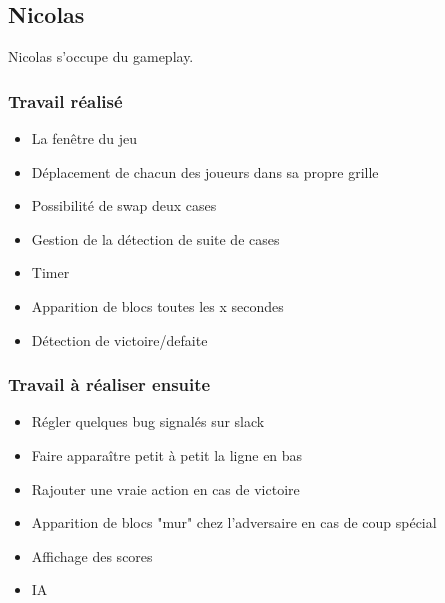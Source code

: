 \documentclass[a4paper,utf8]{article}
\begin{document}
	\subsection{Nicolas}
		Nicolas s'occupe du gameplay.
		\subsubsection{Travail r\'ealis\'e}
			\begin{itemize}
				\item La fen\^{e}tre du jeu
				\item D\'eplacement de chacun des joueurs dans sa propre grille
				\item Possibilit\'e de swap deux cases
				\item Gestion de la d\'etection de suite de cases
				\item Timer
				\item Apparition de blocs toutes les x secondes
				\item D\'etection de victoire/defaite
			\end{itemize}
		\subsubsection{Travail \`a r\'ealiser ensuite}
			\begin{itemize}
				\item R\'egler quelques bug signal\'es sur slack
				\item Faire appara\^{i}tre petit \`a petit la ligne en bas
				\item Rajouter une vraie action en cas de victoire
				\item Apparition de blocs "mur" chez l'adversaire en cas de coup sp\'ecial
				\item Affichage des scores
				\item IA
			\end{itemize}
\end{document}
